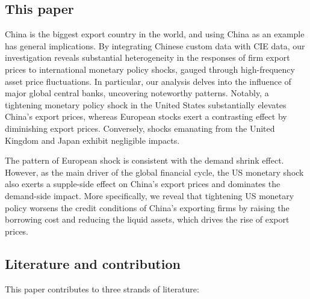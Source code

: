 \documentclass[12pt]{article}
\begin{document}
\subsection{This paper}

China is the biggest export country in the world, and using China as an example has general implications. By integrating Chinese custom data with CIE data, our investigation reveals substantial heterogeneity in the responses of firm export prices to international monetary policy shocks, gauged through high-frequency asset price fluctuations. In particular, our analysis delves into the influence of major global central banks, uncovering noteworthy patterns. Notably, a tightening monetary policy shock in the United States substantially elevates China's export prices, whereas European stocks exert a contrasting effect by diminishing export prices. Conversely, shocks emanating from the United Kingdom and Japan exhibit negligible impacts.

The pattern of European shock is consistent with the demand shrink effect. However, as the main driver of the global financial cycle, the US monetary shock also exerts a supple-side effect on China's export prices and dominates the demand-side impact. More specifically, we reveal that tightening US monetary policy worsens the credit conditions of China's exporting firms by raising the borrowing cost and reducing the liquid assets, which drives the rise of export prices. 

\subsection{Literature and contribution}

This paper contributes to three strands of literature:
\end{document}
